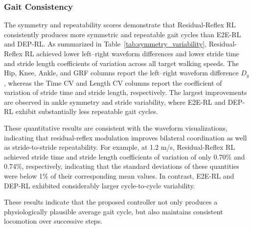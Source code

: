 \documentclass[acmtog,review,anonymous]{acmart}
\begin{document}
\subsubsection{Gait Consistency}
The symmetry and repeatability scores demonstrate that Residual-Reflex RL consistently produces more symmetric and repeatable gait cycles than E2E-RL and DEP-RL. As summarized in Table~\ref{tab:symmetry_variability}, Residual-Reflex RL achieved lower left–right waveform differences and lower stride time and stride length coefficients of variation across all target walking speeds. The Hip, Knee, Ankle, and GRF columns report the left–right waveform difference $D_y$, whereas the Time CV and Length CV columns report the coefficient of variation of stride time and stride length, respectively. The largest improvements are observed in ankle symmetry and stride variability, where E2E-RL and DEP-RL exhibit substantially less repeatable gait cycles.

These quantitative results are consistent with the waveform visualizations, indicating that residual-reflex modulation improves bilateral coordination as well as stride-to-stride repeatability. For example, at 1.2 m/s, Residual-Reflex RL achieved stride time and stride length coefficients of variation of only 0.70\% and 0.74\%, respectively, indicating that the standard deviations of these quantities were below 1\% of their corresponding mean values. In contrast, E2E-RL and DEP-RL exhibited considerably larger cycle-to-cycle variability.

These results indicate that the proposed controller not only produces a physiologically plausible average gait cycle, but also maintains consistent locomotion over successive steps.
\end{document}
